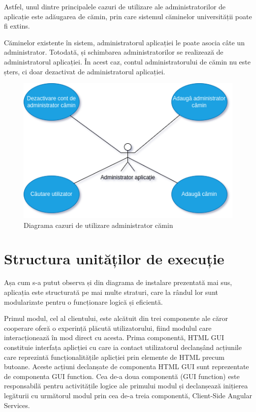 \documentclass[12pt,a4paper]{report}
\theoremstyle{definition}
\theoremstyle{remark}
\begin{document}
\par Astfel, unul dintre principalele cazuri de utilizare ale administratorilor de aplicație este adăugarea de cămin, prin care sistemul căminelor universității poate fi extins.

\par Căminelor existente în sistem, administratorul aplicației le poate asocia câte un administrator. Totodată, și schimbarea administratorilor se realizează de administratorul aplicației. În acest caz, contul administratorului de cămin nu este șters, ci doar dezactivat de administratorul aplicației.

\begin{figure}[H]
    \centering
    \includegraphics[width=0.75\linewidth]{resurse/diagrame/cazuri_de_utilizare_administrator_aplicatie_1.png}
    \caption{Diagrama cazuri de utilizare administrator cămin}
\end{figure}

\section{Structura unităților de execuție}
\par Așa cum s-a putut observa și din diagrama de instalare prezentată mai sus, aplicația este structurată pe mai multe straturi, care la rândul lor sunt modularizate pentru o funcționare logică și eficientă.

\par Primul modul, cel al clientului, este alcătuit din trei componente ale căror cooperare oferă o experință plăcută utilizatorului, fiind modulul care interacționează în mod direct cu acesta. Prima componentă, HTML GUI constituie interfața aplicției cu care ia contact utilizatorul declanșând acțiunile care reprezintă funcționalitățile aplicției prin elemente de HTML precum butoane. Aceste acțiuni declanșate de componenta HTML GUI sunt reprezentate de componenta GUI function. Cea de-a doua componentă (GUI function) este responsabilă pentru activitățile logice ale primului modul și declanșează inițierea legăturii cu următorul modul prin cea de-a treia componentă, Client-Side Angular Services.
\end{document}

